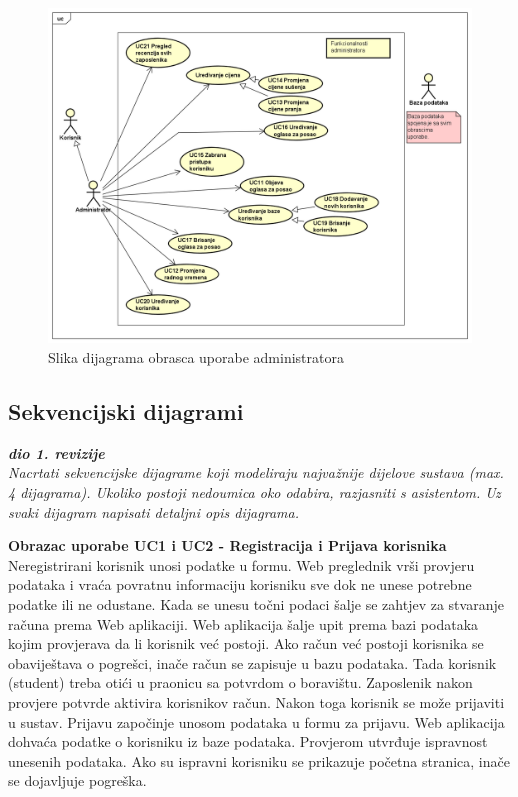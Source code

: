 \begin{figure}[H]
	\includegraphics[width=.9\linewidth]{slike/DOU3.PNG}
	\centering
	\caption{Slika dijagrama obrasca uporabe administratora}
	\label{fig:dou3}
\end{figure}

\subsection{Sekvencijski dijagrami}

\textbf{\textit{dio 1. revizije}}\\

\textit{Nacrtati sekvencijske dijagrame koji modeliraju najvažnije dijelove sustava (max. 4 dijagrama). Ukoliko postoji nedoumica oko odabira, razjasniti s asistentom. Uz svaki dijagram napisati detaljni opis dijagrama.}
\eject

\textbf{Obrazac uporabe UC1 i UC2 - Registracija i Prijava korisnika}\\

Neregistrirani korisnik unosi podatke u formu. Web preglednik vrši provjeru podataka i vraća povratnu informaciju korisniku sve dok ne unese potrebne podatke ili ne odustane. Kada se unesu točni podaci šalje se zahtjev za stvaranje računa prema Web aplikaciji. Web aplikacija šalje upit prema bazi podataka kojim provjerava da li korisnik već postoji. Ako račun već postoji korisnika se obaviještava o pogrešci, inače račun se zapisuje u bazu podataka. Tada korisnik (student) treba otići u praonicu sa potvrdom o boravištu. Zaposlenik nakon provjere potvrde aktivira korisnikov račun. Nakon toga korisnik se može prijaviti u sustav. Prijavu započinje unosom podataka u formu za prijavu. Web aplikacija dohvaća podatke o korisniku iz baze podataka. Provjerom utvrđuje ispravnost unesenih podataka. Ako su ispravni korisniku se prikazuje početna stranica, inače se dojavljuje pogreška.


